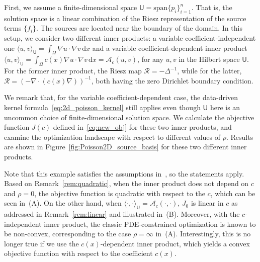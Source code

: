 \documentclass[12pt]{amsart}
\newcommand{\rd}{\mathrm{d}}
\newcommand{\yy}[1]{\textcolor{blue}{{YY: #1}}}
\begin{document}
First, we assume a finite-dimensional space $\mathsf{U} = \text{span}\{p_i\}_{i=1}^n$. That is, the solution space is a linear combination of the Riesz representation of the source terms $\{f_i\}$. The sources are located near the boundary of the domain.
In this setup, we consider two different inner products: a variable coefficient-independent one $\langle u, v\rangle_{\mathsf{U}} = \int_\Omega \nabla u \cdot \nabla v  \,  \mathrm{d}x$ and a variable coefficient-dependent inner product $\langle u, v\rangle_{\mathsf{U}} = \int_\Omega c(x) \nabla u \cdot \nabla v  \,  \mathrm{d}x = \mathcal{A}_c(u,v)$, for any $u, v $ in the Hilbert space $\mathsf{U}$. For the former inner product, the Riesz map $\mathcal{R}=-\Delta^{-1}$, while for the latter, $\mathcal{R}=\left(-\nabla\cdot (c(x) \nabla )\right)^{-1}$, both having the zero Dirichlet boundary condition.

We remark that, for the variable coefficient-dependent case,  the data-driven kernel formula~\eqref{eq:2d_poisson_kernel} still applies even though $\mathsf{U}$ here is an uncommon choice of finite-dimensional solution space.  We calculate the objective function $J(c)$ defined in~\eqref{eq:new_obj} for these two inner products, and examine the optimization landscape with respect to different values of $\rho$. Results are shown in Figure~\ref{fig:Poisson2D_source_basis} for these two different inner products.

Note that this example satisfies the assumptions in~, so the statements apply. Based on Remark~\ref{rem:quadratic}, when the inner product does not depend on $c$ and $\rho = 0$, the objective function is quadratic with respect to the $c$, which can be seen in~(A). On the other hand, when $\langle \cdot, \cdot \rangle_{\mathsf{U}} = \mathcal{A}_c(\cdot, \cdot)$, $J_0$ is linear in $c$ as addressed in Remark~\ref{rem:linear} and illustrated in~(B). Moreover, with the $c$-independent inner product, the classic PDE-constrained optimization is known to be non-convex, corresponding to the case $\rho = \infty$ in~(A). Interestingly, this is no longer true if we use the $c(x)$-dependent inner product, which yields a convex objective function with respect to the coefficient $c(x)$. %
\end{document}
